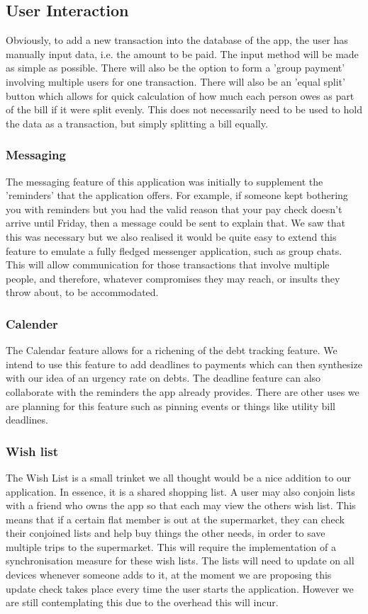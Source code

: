 \documentclass[a4paper,9t]{article}
\begin{document}
\subsection*{User Interaction}
Obviously, to add a new transaction into the database of the app, the user has manually input data, i.e. the amount to be paid. The input method will be made as simple as possible. There will also be the option to form a 'group payment' involving multiple users for one transaction. There will also be an 'equal split' button which allows for quick calculation of how much each person owes as part of the bill if it were split evenly. This does not necessarily need to be used to hold the data as a transaction, but simply splitting a bill equally.

\subsubsection*{Messaging}
The messaging feature of this application was initially to supplement the 'reminders' that the application offers. For example, if someone kept bothering you with reminders but you had the valid reason that your pay check doesn't arrive until Friday, then a message could be sent to explain that.
We saw that this was necessary but we also realised it would be quite easy to extend this feature to emulate a fully fledged messenger application, such as group chats. This will allow communication for those transactions that involve multiple people, and therefore, whatever compromises they may reach, or insults they throw about, to be accommodated.

\subsubsection*{Calender}
The Calendar feature allows for a richening of the debt tracking feature. We intend to use this feature to add deadlines to payments which can then synthesize with our idea of an urgency rate on debts. The deadline feature can also collaborate with the reminders the app already provides.
There are other uses we are planning for this feature such as pinning events or things like utility bill deadlines.

\subsubsection*{Wish list}
The Wish List is a small trinket we all thought would be a nice addition to our application. In essence, it is a shared shopping list. A user may also conjoin lists with a friend who owns the app so that each may view the others wish list. This means that if a certain flat member is out at the supermarket, they can check their conjoined lists and help buy things the other needs, in order to save multiple trips to the supermarket.
This will require the implementation of a synchronisation measure for these wish lists. The lists will need to update on all devices whenever someone adds to it, at the moment we are proposing this update check takes place every time the user starts the application. However we are still contemplating this due to the overhead this will incur.
\end{document}
